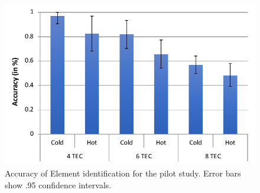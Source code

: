 \documentclass[preprint,12pt]{elsarticle}
\begin{document}


\begin{figure}[tp]
  \centering
  \includegraphics[width=0.7\columnwidth]{img/fig6.pdf}
  \caption{Accuracy of Element identification for the pilot study. Error bars show .95 confidence intervals.}
  \label{fig:6}
\end{figure}
\end{document}
